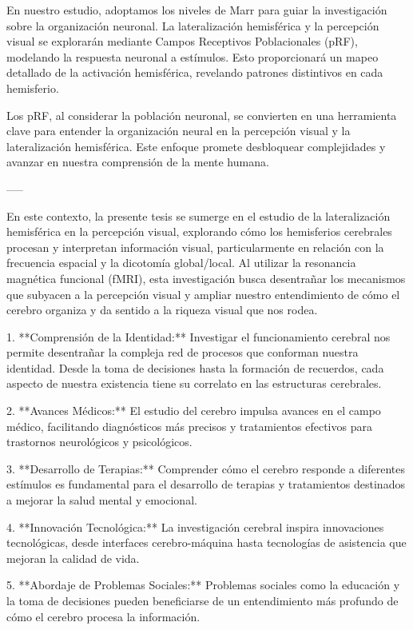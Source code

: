 \documentclass{article}
\begin{document}
	En nuestro estudio, adoptamos los niveles de Marr para guiar la investigación sobre la organización neuronal. La lateralización hemisférica y la percepción visual se explorarán mediante Campos Receptivos Poblacionales (pRF), modelando la respuesta neuronal a estímulos. Esto proporcionará un mapeo detallado de la activación hemisférica, revelando patrones distintivos en cada hemisferio.
	
	Los pRF, al considerar la población neuronal, se convierten en una herramienta clave para entender la organización neural en la percepción visual y la lateralización hemisférica. Este enfoque promete desbloquear complejidades y avanzar en nuestra comprensión de la mente humana.
	
	-----
	
	En este contexto, la presente tesis se sumerge en el estudio de la lateralización hemisférica en la percepción visual, explorando cómo los hemisferios cerebrales procesan y interpretan información visual, particularmente en relación con la frecuencia espacial y la dicotomía global/local. Al utilizar la resonancia magnética funcional (fMRI), esta investigación busca desentrañar los mecanismos que subyacen a la percepción visual y ampliar nuestro entendimiento de cómo el cerebro organiza y da sentido a la riqueza visual que nos rodea.
	
	1. **Comprensión de la Identidad:** Investigar el funcionamiento cerebral nos permite desentrañar la compleja red de procesos que conforman nuestra identidad. Desde la toma de decisiones hasta la formación de recuerdos, cada aspecto de nuestra existencia tiene su correlato en las estructuras cerebrales.
	
	2. **Avances Médicos:** El estudio del cerebro impulsa avances en el campo médico, facilitando diagnósticos más precisos y tratamientos efectivos para trastornos neurológicos y psicológicos.
	
	3. **Desarrollo de Terapias:** Comprender cómo el cerebro responde a diferentes estímulos es fundamental para el desarrollo de terapias y tratamientos destinados a mejorar la salud mental y emocional.
	
	4. **Innovación Tecnológica:** La investigación cerebral inspira innovaciones tecnológicas, desde interfaces cerebro-máquina hasta tecnologías de asistencia que mejoran la calidad de vida.
	
	5. **Abordaje de Problemas Sociales:** Problemas sociales como la educación y la toma de decisiones pueden beneficiarse de un entendimiento más profundo de cómo el cerebro procesa la información.
	
\end{document}
